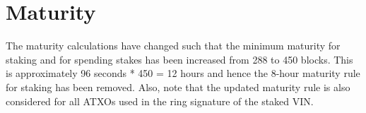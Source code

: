 \section{Maturity}
The maturity calculations have changed such that the minimum maturity for staking and for spending stakes has been increased from 288 to 450 blocks. This is approximately 96 seconds * 450 = 12 hours and hence the 8-hour maturity rule for staking has been removed. Also, note that the updated maturity rule is also considered for all ATXOs used in the ring signature of the staked VIN.